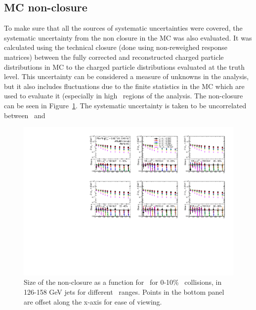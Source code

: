 \subsection{MC non-closure}
To make sure that all the sources of systematic uncertainties were covered, the systematic uncertainty from the non closure in the MC was also evaluated.
It was calculated using the technical closure (done using non-reweighed response matrices) between the fully corrected and reconstructed charged particle distributions in MC to the charged particle distributions evaluated at the truth level.
This uncertainty can be considered a measure of unknowns in the analysis, but it also includes fluctuations due to the finite statistics in the MC which are used to evaluate it (especially in high \pttrk\ regions of the analysis.
The non-closure can be seen in Figure~\ref{fig:pbpbclosure}.
The systematic uncertainty is taken to be uncorrelated between \pbpb\ and \pp 

\begin{figure}
\centerline{\includegraphics[page=1,width=1.\textwidth]{figures/main/systematics/ChPS_final_dR_PbPb_MC.pdf}}
\caption{Size of the non-closure as a function for \rvar\ for 0-10\% \pbpb\ collisions, in 126-158 GeV jets for different \pttrk\ ranges.
Points in the bottom panel are offset along the x-axis for ease of viewing.}
\label{fig:pbpbclosure}
\end{figure}



